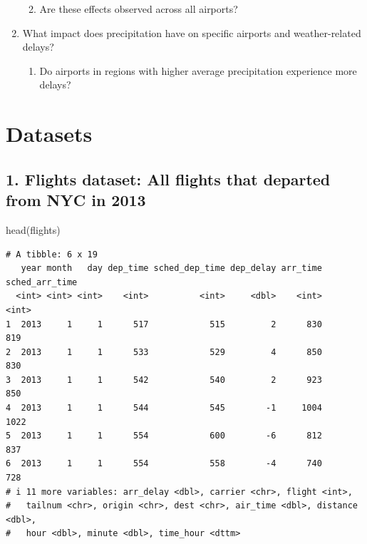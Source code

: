 \documentclass[
  10pt,
  letterpaper,
  DIV=11,
  numbers=noendperiod]{scrartcl}
\newenvironment{Shaded}{\begin{snugshade}}{\end{snugshade}}
\newcommand{\FunctionTok}[1]{\textcolor[rgb]{0.28,0.35,0.67}{#1}}
\newcommand{\NormalTok}[1]{\textcolor[rgb]{0.00,0.23,0.31}{#1}}
\providecommand{\tightlist}{%
  \setlength{\itemsep}{0pt}\setlength{\parskip}{0pt}}\usepackage{longtable,booktabs,array}
\begin{document}
\begin{enumerate}
  \begin{enumerate}
  \def\labelenumii{\alph{enumii}.}
  \tightlist
  \item
    Are these effects observed across all airports?
  \end{enumerate}
\item
  What impact does precipitation have on specific airports and
  weather-related delays?

  \begin{enumerate}
  \def\labelenumii{\alph{enumii}.}
  \tightlist
  \item
    Do airports in regions with higher average precipitation experience
    more delays?
  \end{enumerate}
\end{enumerate}

\section{Datasets}\label{datasets}

\subsection{1. Flights dataset: All flights that departed from NYC in
2013}\label{flights-dataset-all-flights-that-departed-from-nyc-in-2013}

\begin{Shaded}
\begin{Highlighting}[numbers=left,,]
\FunctionTok{head}\NormalTok{(flights)}
\end{Highlighting}
\end{Shaded}

\begin{verbatim}
# A tibble: 6 x 19
   year month   day dep_time sched_dep_time dep_delay arr_time sched_arr_time
  <int> <int> <int>    <int>          <int>     <dbl>    <int>          <int>
1  2013     1     1      517            515         2      830            819
2  2013     1     1      533            529         4      850            830
3  2013     1     1      542            540         2      923            850
4  2013     1     1      544            545        -1     1004           1022
5  2013     1     1      554            600        -6      812            837
6  2013     1     1      554            558        -4      740            728
# i 11 more variables: arr_delay <dbl>, carrier <chr>, flight <int>,
#   tailnum <chr>, origin <chr>, dest <chr>, air_time <dbl>, distance <dbl>,
#   hour <dbl>, minute <dbl>, time_hour <dttm>
\end{verbatim}
\end{document}
